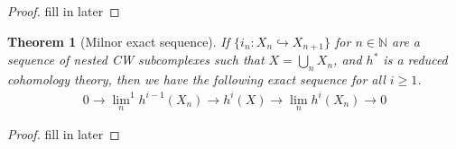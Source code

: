 \documentclass[12pt, notitlepage]{article}
\newtheorem{thm}{Theorem}[section]
\theoremstyle{definition}
\begin{document}
\begin{proof}
  fill in later
\end{proof}

\begin{thm}[Milnor exact sequence] \label{thm-milnor} If $\{ i_n : X_n \hookrightarrow X_{n+1} \}$
  for $n \in \mathbb{N}$ are a sequence of nested CW subcomplexes such that $X = \bigcup_n X_n$, and
  $h^{\ast}$ is a reduced cohomology theory, then we have the following exact sequence for all
  $i \geq 1$.
  \begin{align*}
    0 \rightarrow {\lim_{n}}^1 h^{i-1}(X_n) \rightarrow h^i(X) \rightarrow \lim_n h^i(X_n) \rightarrow 0
  \end{align*}
\end{thm}

\begin{proof}
  fill in later
\end{proof}

%  
\end{document}
